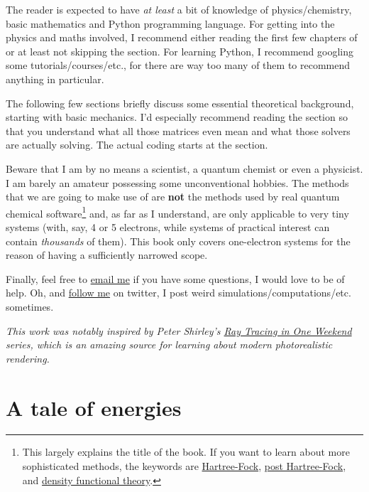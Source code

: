 \documentclass{article}
\begin{document}
The reader is expected to have \textit{at least} a bit of knowledge of physics/chemistry, basic mathematics and Python programming language. For getting into the physics and maths involved, I recommend either reading the first few chapters of \cite{ref:atkins} or at least not skipping the  section. For learning Python, I recommend googling some tutorials/courses/etc., for there are way too many of them to recommend anything in particular.

The following few sections briefly discuss some essential theoretical background, starting with basic mechanics. I'd especially recommend reading the  section so that you understand what all those matrices even mean and what those solvers are actually solving. The actual coding starts at the  section.

Beware that I am by no means a scientist, a quantum chemist or even a physicist. I am barely an amateur possessing some unconventional hobbies. The methods that we are going to make use of are \textbf{not} the methods used by real quantum chemical software\footnote{This largely explains the title of the book. If you want to learn about more sophisticated methods, the keywords are \href{https://en.wikipedia.org/wiki/Hartree\%E2\%80\%93Fock_method}{Hartree-Fock}, \href{https://en.wikipedia.org/wiki/Post\%E2\%80\%93Hartree\%E2\%80\%93Fock}{post Hartree-Fock}, and \href{https://en.wikipedia.org/wiki/Density_functional_theory}{density functional theory}.} and, as far as I understand, are only applicable to very tiny systems (with, say, 4 or 5 electrons, while systems of practical interest can contain \textit{thousands} of them). This book only covers one-electron systems for the reason of having a sufficiently narrowed scope.

Finally, feel free to \href{mailto:lisyarus@gmail.com}{email me} if you have some questions, I would love to be of help. Oh, and \href{https://twitter.com/lisyarus}{follow me} on twitter, I post weird simulations/computations/etc. sometimes.

\bigbreak
\textit{This work was notably inspired by Peter Shirley's \href{https://raytracing.github.io}{Ray Tracing in One Weekend} series, which is an amazing source for learning about modern photorealistic rendering.}

\newpage

\section{A tale of energies}
\end{document}
